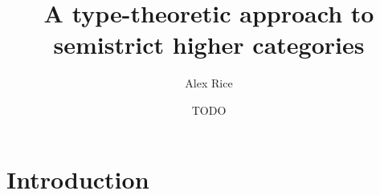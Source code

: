 \documentclass{cam-thesis}
\title{A type-theoretic approach to semistrict higher categories}
\author{Alex Rice}
\date{TODO}
\begin{document}
\frontmatter{}



\chapter{Introduction}



\printbibliography
\end{document}
